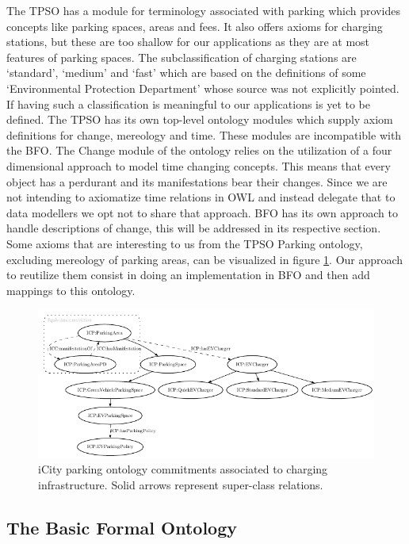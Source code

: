 The TPSO has a module for terminology associated with parking which provides
concepts like parking spaces, areas and fees. It also offers axioms for
charging stations, but these are too shallow for our applications as they are
at most features of parking spaces. The subclassification of charging stations
are `standard', `medium' and `fast' which are based on the definitions of some
`Environmental Protection Department' whose source was not explicitly pointed.
If having such a classification is meaningful to our applications is yet to be
defined. The TPSO has its own top-level ontology modules which supply axiom
definitions for change, mereology and time. These modules are incompatible with
the BFO. The Change module of the ontology relies on the utilization of a four
dimensional approach to model time changing concepts. This means that every
object has a perdurant and its manifestations bear their changes. Since we are
not intending to axiomatize time relations in OWL and instead delegate that to
data modellers we opt not to share that approach. BFO has its own approach to
handle descriptions of change, this will be addressed in its respective
section. Some axioms that are interesting to us from the TPSO Parking ontology,
excluding mereology of parking areas, can be visualized in figure
\ref{parkingfig}. Our approach to reutilize them consist in doing an
implementation in BFO and then add mappings to this ontology. 

\begin{figure}[h]
    \centering
    \includegraphics{images/PARKING.pdf}
    \caption{iCity parking ontology commitments associated to charging infrastructure. Solid arrows represent super-class relations.}
    \label{parkingfig}
\end{figure}

\subsection{The Basic Formal Ontology}
\label{upperlevel}

